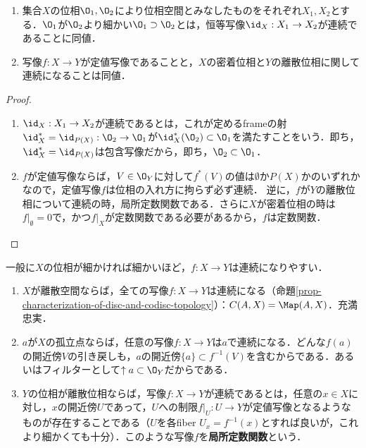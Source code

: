 \documentclass[uplatex,dvipdfmx]{jsreport}
\begin{document}
\begin{proposition}\mbox{}
    \begin{enumerate}
        \item 集合$X$の位相$\O_1,\O_2$により位相空間とみなしたものをそれぞれ$X_1,X_2$とする．$\O_1$が$\O_2$より細かい$\O_1\supset\O_2$とは，恒等写像$\id_X:X_1\to X_2$が連続であることに同値．
        \item 写像$f:X\to Y$が定値写像であることと，$X$の密着位相と$Y$の離散位相に関して連続になることは同値．
    \end{enumerate}
\end{proposition}
\begin{proof}\mbox{}
    \begin{enumerate}
        \item $\id_X:X_1\to X_2$が連続であるとは，これが定めるframeの射$\id_X^*=\id_{P(X)}:\O_2\to\O_1$が$\id_X^*(\O_2)\subset\O_1$を満たすことをいう．即ち，$\id_X^*=\id_{P(X)}$は包含写像だから，即ち，$\O_2\subset\O_1$．
        \item $f$が定値写像ならば，$V\in\O_Y$に対して$f^*(V)$の値は$\emptyset$か$P(X)$かのいずれかなので，定値写像$f$は位相の入れ方に拘らず必ず連続．
        逆に，$f$が$Y$の離散位相について連続の時，局所定数関数である．さらに$X$が密着位相の時は$f|_\emptyset=0$で，かつ$f|_X$が定数関数である必要があるから，$f$は定数関数．
    \end{enumerate}
\end{proof}

\begin{definition}
    一般に$X$の位相が細かければ細かいほど，$f:X\to Y$は連続になりやすい．
    \begin{enumerate}
        \item $X$が離散空間ならば，全ての写像$f:X\to Y$は連続になる（命題\ref{prop-characterization-of-disc-and-codisc-topology}）：$C(A,X)=\Map(A,X)$．充満忠実．
        \item $a$が$X$の孤立点ならば，任意の写像$f:X\to Y$は$a$で連続になる．どんな$f(a)$の開近傍$V$の引き戻しも，$a$の開近傍$\{a\}\subset f^{-1}(V)$を含むからである．あるいはフィルターとして$\uparrow a\subset\O_Y$だからである．
        \item $Y$の位相が離散位相ならば，写像$f:X\to Y$が連続であるとは，任意の$x\in X$に対し，$x$の開近傍$U$であって，$U$への制限$f|_U:U\to Y$が定値写像となるようなものが存在することである（$U$を各fiber $U_x=f^{-1}(x)$とすれば良いが，これより細かくても十分）．このような写像$f$を\textbf{局所定数関数}という．
    \end{enumerate}
\end{definition}
\end{document}
